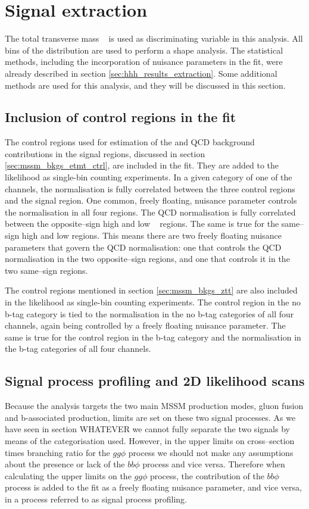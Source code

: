 \section{Signal extraction}
\label{sec:mssm_signalextraction}
The total transverse mass \mTtot~ is used as discriminating variable in this analysis.
All bins of the distribution are used to perform a shape analysis. The statistical
methods, including the incorporation of nuisance parameters in the fit, were already
described in section \ref{sec:hhh_results_extraction}. Some additional
methods are used for this analysis, and they will be discussed in this section.

\subsection{Inclusion of control regions in the fit}
\label{sec:mssm_sigext_ctrl}
The control regions used for estimation of the 
\Wjets and QCD background contributions in the signal regions, discussed
in section \ref{sec:mssm_bkgs_etmt_ctrl}, are included in the fit. They
are added to the likelihood as single-bin counting experiments. In a given
category of one of the channels, the \Wjets
normalisation is fully correlated between the three control 
regions and the signal region. One common, freely floating, nuisance parameter
controls the \Wjets normalisation in all four regions. The QCD normalisation
is fully correlated between the opposite--sign high and low \mT~ regions. The
same is true for the same--sign high and low \mT regions. This means there are
two freely floating nuisance parameters that govern the QCD normalisation: one
that controls the QCD normalisation in the two opposite--sign regions, and one
that controls it in the two same--sign regions. 

The \Zmm control regions mentioned in section \ref{sec:mssm_bkgs_ztt}
are also included in the likelihood as single-bin counting experiments.
The \Zmm control region in the no b-tag category is tied
to the \Ztautau normalisation in the no b-tag categories of all four
channels, again being controlled by a freely floating nuisance parameter. 
The same is true for the \Zmm control region in the b-tag category
and the \Ztautau normalisation in the b-tag categories of all four channels.

\subsection{Signal process profiling and 2D likelihood scans}
\label{sec:mssm_sigext_profile}
Because the analysis targets the two main MSSM production modes, gluon fusion and
b-associated production, limits are set on these two signal processes. As we
have seen in section WHATEVER we cannot fully separate the two signals by means
of the categorisation used. 
However, in the upper limits on cross--section times branching ratio for the $gg\phi$
process we should not make any assumptions about the presence or lack of the $bb\phi$
process and vice versa. Therefore when calculating the upper limits on the $gg\phi$
process, the contribution of the $bb\phi$ process is added to the fit as a freely floating nuisance
parameter, and vice versa, in a process referred to as signal process profiling. 

